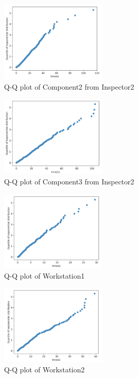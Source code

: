 \documentclass{article}
\begin{document}
\begin{figure}[htbp]
\begin{center}
\includegraphics[width=2in]{exp2.png}
\caption{Q-Q plot of Component2 from Inspector2}
\label{exp2}
\end{center}
\end{figure}

\begin{figure}[htbp]
\begin{center}
\includegraphics[width=2in]{exp3.png}
\caption{Q-Q plot of Component3 from Inspector2}
\label{exp3}
\end{center}
\end{figure}

\begin{figure}[htbp]
\begin{center}
\includegraphics[width=2in]{exp4.png}
\caption{Q-Q plot of Workstation1}
\label{exp4}
\end{center}
\end{figure}

\begin{figure}[htbp]
\begin{center}
\includegraphics[width=2in]{exp5.png}
\caption{Q-Q plot of Workstation2}
\label{exp5}
\end{center}
\end{figure}
\end{document}
